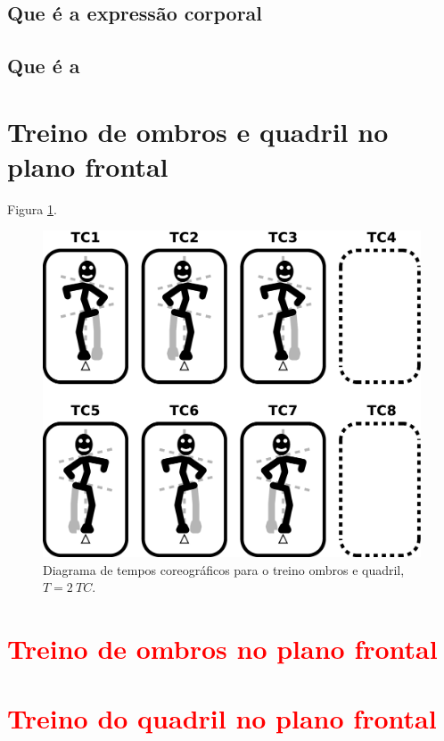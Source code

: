 \subsection{Que é a expressão corporal}
\cite{balcells2002expresion}
\cite[pp. 215]{moreno2008expresion}

\subsection{Que é a \bodyisolation}


\section{ Treino de ombros e quadril no plano frontal}

Figura \ref{fig:pessoalombroquadril1}.

\begin{figure}[!h]
  \centering
    \includegraphics[width=\bodyboxsize]{chapters/cap-body-control/postura-ombro1.eps}
\caption{Diagrama de tempos coreográficos para o treino ombros e quadril, $T=2~TC$.}
\label{fig:pessoalombroquadril1}
\end{figure}

\section{\textcolor{red}{  Treino de ombros no plano frontal}}

\section{\textcolor{red}{  Treino do quadril no plano frontal}}




